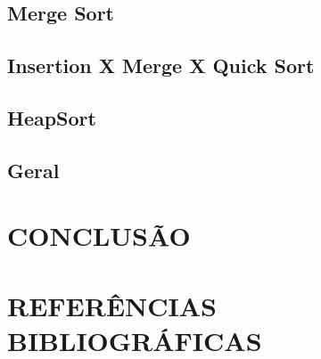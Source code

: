 \documentclass[12pt,arial]{article}
\begin{document}
        \subsection{Merge Sort}
		
        \newpage
        \subsection{Insertion X Merge X Quick Sort}
		
        \subsection{HeapSort}
		
        \newpage
        \subsection{Geral}
		
		\newpage
  
		\section{CONCLUSÃO}
		
		\newpage
  
		\section{REFERÊNCIAS BIBLIOGRÁFICAS}
		
        
        

        	
\end{document}
